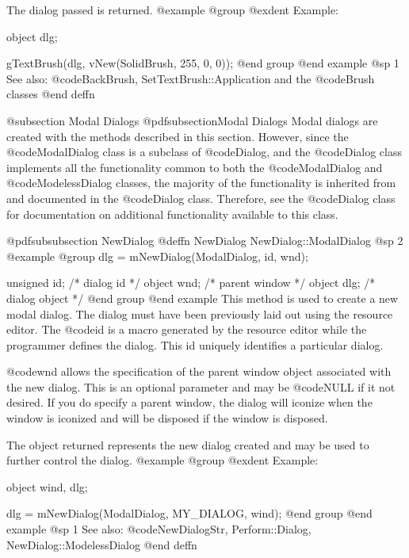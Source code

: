 The dialog passed is returned.
@example
@group
@exdent Example:

object  dlg;

gTextBrush(dlg, vNew(SolidBrush, 255, 0, 0));
@end group
@end example
@sp 1
See also:  @code{BackBrush, SetTextBrush::Application}
        and the @code{Brush} classes
@end deffn



















@subsection Modal Dialogs
@pdfsubsection{Modal Dialogs}
Modal dialogs are created with the methods described in this section.
However, since the @code{ModalDialog} class is a subclass of @code{Dialog},
and the @code{Dialog} class implements all the functionality common to
both the @code{ModalDialog} and @code{ModelessDialog} classes, the
majority of the functionality is inherited from and documented in
the @code{Dialog} class.  Therefore, see the @code{Dialog} class
for documentation on additional functionality available to this class.



@pdfsubsubsection {NewDialog}
@deffn {NewDialog} NewDialog::ModalDialog
@sp 2
@example
@group
dlg = mNewDialog(ModalDialog, id, wnd);

unsigned  id;   /*  dialog id      */
object    wnd;  /*  parent window  */
object    dlg;  /*  dialog object  */
@end group
@end example
This method is used to create a new modal dialog.  The dialog must have
been previously laid out using the resource editor.  The @code{id}
is a macro generated by the resource editor while the programmer defines
the dialog.  This id uniquely identifies a particular dialog.

@code{wnd} allows the specification of the parent window object associated
with the new dialog.  This is an optional parameter and may be @code{NULL}
if it not desired.  If you do specify a parent window, the dialog will
iconize when the window is iconized and will be disposed if the window
is disposed.

The object returned represents the new dialog created and may be
used to further control the dialog.
@example
@group
@exdent Example:

object  wind, dlg;

dlg = mNewDialog(ModalDialog, MY_DIALOG, wind);
@end group
@end example
@sp 1
See also:  @code{NewDialogStr, Perform::Dialog, NewDialog::ModelessDialog}
@end deffn










